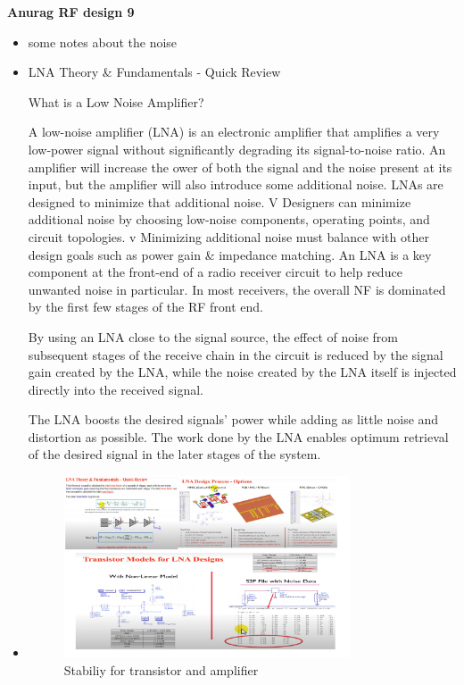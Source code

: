 \documentclass{article}
\begin{document}
\begin{itemize}
     










    

\end{itemize}

\textbf{Anurag RF design 9}
\begin{itemize}
    \item some notes about the noise
    \item LNA Theory & Fundamentals - Quick Review

    What is a Low Noise Amplifier?
    
    A low-noise amplifier (LNA) is an electronic amplifier that amplifies a very low-power signal without
    significantly degrading its signal-to-noise ratio.
    An amplifier will increase the ower of both the signal and the noise present at its input, but the amplifier will
    also introduce some additional noise. LNAs are designed to minimize that additional noise.
    V Designers can minimize additional noise by choosing low-noise components, operating points, and
    circuit topologies.
    v Minimizing additional noise must balance with other design goals such as power gain & impedance matching.
    An LNA is a key component at the front-end of a radio
receiver circuit to help reduce unwanted noise in particular. In
most receivers, the overall NF is dominated by the first few
stages of the RF front end.

By using an LNA close to the signal source, the effect of noise from subsequent stages of the receive chain in
the circuit is reduced by the signal gain created by the LNA, while the noise created by the LNA itself is injected
directly into the received signal.


The LNA boosts the desired signals' power while adding as little noise and distortion as possible. The work done
by the LNA enables optimum retrieval of the desired signal in the later stages of the system.
    




    
    \item \begin{figure}[H]
        \centering
        \includegraphics[width=0.8\textwidth]{figures/Noise1.pdf}
        \caption{Stabiliy for transistor and amplifier}
        \label{Noise1}
    \end{figure}
    

\end{itemize}
\end{document}
